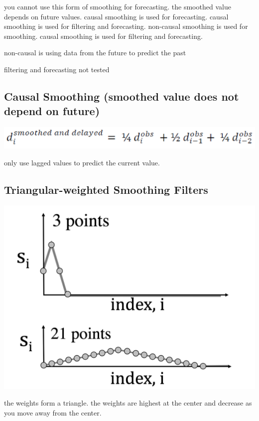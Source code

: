 \documentclass[11pt]{article}
\theoremstyle{definition}
\begin{document}
you cannot use this form of smoothing for forecasting. the smoothed value depends on future values. causal smoothing is used for forecasting. causal smoothing is used for filtering and forecasting. non-causal smoothing is used for smoothing. causal smoothing is used for filtering and forecasting. 

non-causal is using data from the future to predict the past

filtering and forecasting not tested

\subsection{Causal Smoothing
(smoothed value does not depend on future)}
\includegraphics[width = \textwidth]{16.png}

only use lagged values to predict the current value.

\subsection{Triangular-weighted Smoothing Filters}
\includegraphics[width = \textwidth/2]{17.png}

the weights form a triangle. the weights are highest at the center and decrease as you move away from the center.
\end{document}
